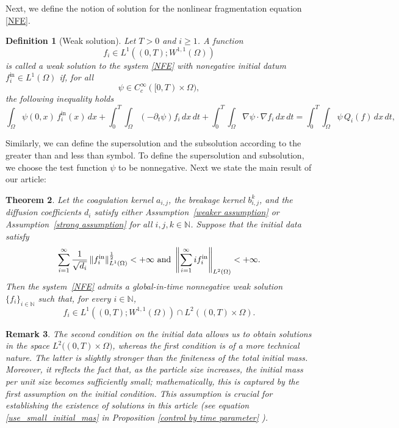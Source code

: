 \documentclass[a4paper,12pt,reqno]{amsart}
\theoremstyle{plain}
\newtheorem{thm}{Theorem}[section]
\newtheorem{defn}[thm]{Definition}
\newtheorem{rem}[thm]{Remark}
\numberwithin{equation}{section}
\begin{document}
	
	Next, we define the notion of solution for the nonlinear fragmentation equation \eqref{NFE}.
	\begin{defn}[Weak solution]\label{definition weak solution}
		Let $T>0$ and $i\ge1$. A function
		\[
		f_i \in L^1\!\left((0,T); W^{1,1}(\Omega)\right)
		\]
		is called a weak solution to the system \eqref{NFE} with nonegative initial datum
		$f_i^{\mathrm{in}}\in L^1(\Omega)$ if, for all 
		\[
		\psi \in C_c^\infty([0,T)\times\Omega),
		\]
		the following inequality holds
		\[
		\int_\Omega
		\psi(0,x)\, f_i^{\mathrm{in}}(x)\, dx
		+
		\int_0^T \int_\Omega
		\left(-\partial_t \psi\right) f_i
		\,dx\,dt
		+
		\int_0^T \int_\Omega
		\nabla \psi \cdot \nabla f_i
		\,dx\,dt
		=
		\int_0^T \int_\Omega
		\psi \, Q_{i}(f)
		\,dx\,dt,
		\]
	\end{defn}
	Similarly, we can define the supersolution and the subsolution according to the greater than and less than symbol. To define the supersolution and subsolution, we choose the test function $\psi$ to be nonnegative.
	Next we state the main result of our article:
	\begin{thm}\label{existence result}
		Let the coagulation kernel $a_{i,j}$, the breakage kernel $b_{i,j}^k$, and the diffusion coefficients $d_i$ satisfy either Assumption~\ref{weaker assumption} or Assumption~\ref{strong assumption} for all $i,j,k \in \mathbb{N}$. Suppose that the initial data satisfy
		\[
		\sum_{i=1}^{\infty} \frac{1}{\sqrt{d_i}} \, \|f_i^{\rm{in}}\|_{L^1(\Omega)}^{\frac12} < +\infty \ \mbox{and} \ \left\|\sum_{i=1}^{\infty}if_i^{\rm{in}}\right\|_{L^2(\Omega)}<+\infty.
		\]
		Then the system~\eqref{NFE} admits a global-in-time nonnegative weak solution $\{f_i\}_{i\in\mathbb{N}}$ such that, for every $i \in \mathbb{N}$,
		\[
		f_i \in L^1\!\left((0,T); W^{1,1}(\Omega)\right)
		\cap L^2\!\left((0,T)\times\Omega\right).
		\]
	\end{thm}
	\begin{rem}
		The second condition on the initial data allows us to obtain solutions in the space
		$L^2\big((0,T)\times\Omega\big)$, whereas the first condition is of a more technical nature.
		The latter is slightly stronger than the finiteness of the total initial mass.
		Moreover, it reflects the fact that, as the particle size increases, the initial mass per unit size becomes sufficiently small; mathematically, this is captured by the first assumption on the initial condition. This assumption is crucial for establishing the existence of solutions in this article (see equation \eqref{use_small_initial_mas} in  Proposition \ref{control by time parameter} ).
	\end{rem}
	
\end{document}
